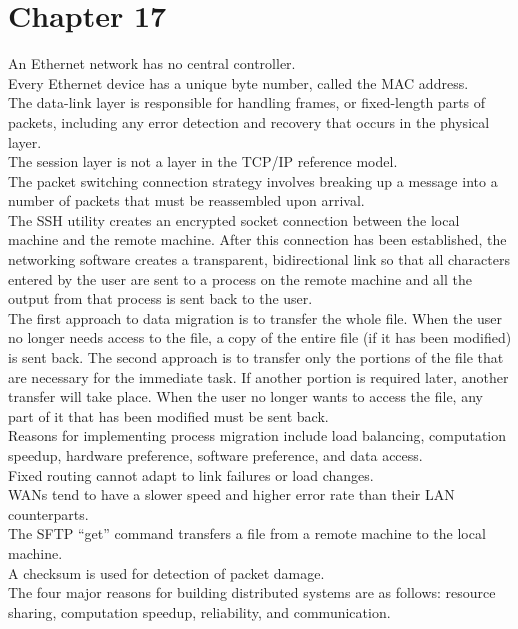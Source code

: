 \documentclass[10pt]{article}
\begin{document}
\section*{\centering Chapter 17}
An Ethernet network has no central controller.\\[2mm]
Every Ethernet device has a unique byte number, called the MAC address.\\[2mm]
The data-link layer is responsible for handling frames, or fixed-length parts of packets, including any error detection and recovery that occurs in the physical layer.\\[2mm]
The session layer is not a layer in the TCP/IP reference model.\\[2mm]
The packet switching connection strategy involves breaking up a message into a number of packets that must be reassembled upon arrival.\\[2mm]
The SSH utility creates an encrypted socket connection between the local machine and the remote machine. After this connection has been established, the networking software creates a transparent, bidirectional link so that all characters entered by the user are sent to a process on the remote machine and all the output from that process is sent back to the user.\\[2mm]
The first approach to data migration is to transfer the whole file. When the user no longer needs access to the file, a copy of the entire file (if it has been modified) is sent back. The second approach is to transfer only the portions of the file that are necessary for the immediate task. If another portion is required later, another transfer will take place. When the user no longer wants to access the file, any part of it that has been modified must be sent back.\\[2mm]
Reasons for implementing process migration include load balancing, computation speedup, hardware preference, software preference, and data access.\\[2mm]
Fixed routing cannot adapt to link failures or load changes.\\[2mm]
WANs tend to have a slower speed and higher error rate than their LAN counterparts.\\[2mm]
The SFTP ``get'' command transfers a file from a remote machine to the local machine.\\[2mm]
A checksum is used for detection of packet damage.\\[2mm]
The four major reasons for building distributed systems are as follows: resource sharing, computation speedup, reliability, and communication.\\[2mm]
\end{document}
